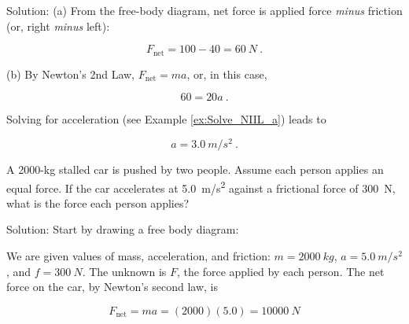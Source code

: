 \documentclass{article}
\begin{document}
Solution: (a) From the free-body diagram, net force is applied force \textit{minus} friction (or, right \textit{minus} left):

\begin{equation*}
    F_{\text{net}} = 100 - 40 = \SI{60}{N}\ .
\end{equation*}


(b) By Newton's 2nd Law, $F_{\text{net}} = m a$, or, in this case,

\begin{equation*}
    60 = 20 a\ .
\end{equation*}

Solving for acceleration (see Example \ref{ex:Solve_NIIL_a}) leads to

\begin{equation*}
    a = \SI{3.0}{m/s^2}\ .
\end{equation*}



\begin{example} \label{ex:StalledCar} 
A 2000-kg stalled car is pushed by two people. Assume each person applies an equal force. If the car accelerates at \SI{5.0}{m/s^2} against a frictional force of \SI{300}{N}, what is the force each person applies? 
\end{example}

Solution: Start by drawing a free body diagram:

\begin{center}
    
\end{center}


We are given values of mass, acceleration, and friction: $m = \SI{2000}{kg}$, $a = \SI{5.0}{m/s^2}$, and $f = \SI{300}{N}$. The unknown is $F$, the force applied by each person. The net force on the car, by Newton's second law, is

\begin{equation*}
    F_{\text{net}} = ma = (2000)(5.0) = \SI{10000}{N}
\end{equation*}
\end{document}
